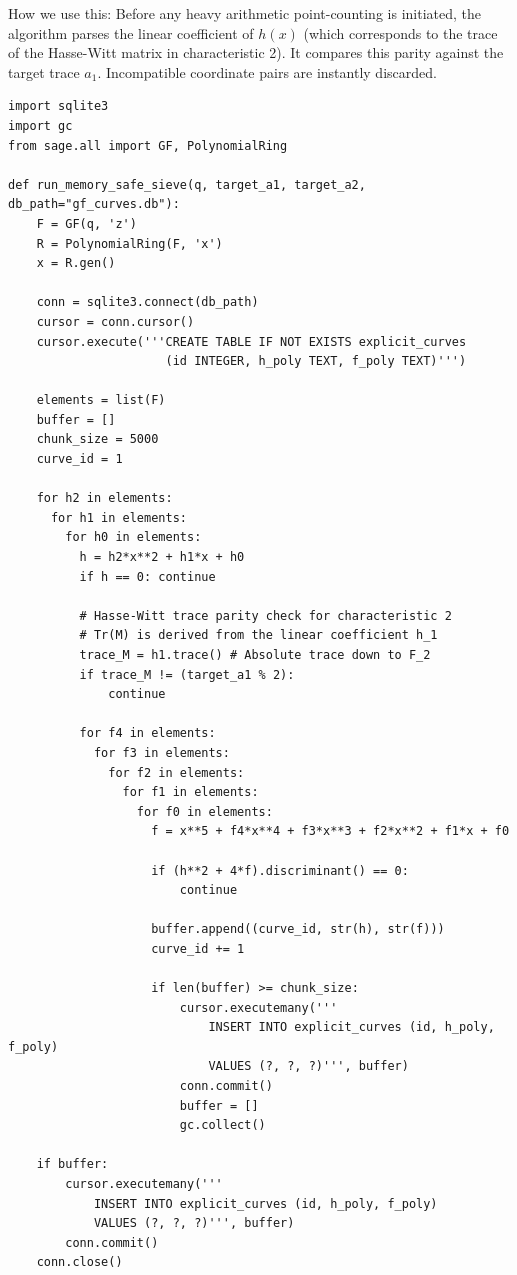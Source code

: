 \documentclass[letterpaper, 11pt]{article}
\begin{document}
How we use this: Before any heavy arithmetic point-counting is initiated, the algorithm parses the linear coefficient of $h(x)$ (which corresponds to the trace of the Hasse-Witt matrix in characteristic 2). It compares this parity against the target trace $a_1$. Incompatible coordinate pairs are instantly discarded.

\begin{lstlisting}
import sqlite3
import gc
from sage.all import GF, PolynomialRing

def run_memory_safe_sieve(q, target_a1, target_a2, db_path="gf_curves.db"):
    F = GF(q, 'z')
    R = PolynomialRing(F, 'x')
    x = R.gen()
    
    conn = sqlite3.connect(db_path)
    cursor = conn.cursor()
    cursor.execute('''CREATE TABLE IF NOT EXISTS explicit_curves
                      (id INTEGER, h_poly TEXT, f_poly TEXT)''')
    
    elements = list(F)
    buffer = []
    chunk_size = 5000
    curve_id = 1
    
    for h2 in elements:
      for h1 in elements:
        for h0 in elements:
          h = h2*x**2 + h1*x + h0
          if h == 0: continue
          
          # Hasse-Witt trace parity check for characteristic 2
          # Tr(M) is derived from the linear coefficient h_1
          trace_M = h1.trace() # Absolute trace down to F_2
          if trace_M != (target_a1 % 2):
              continue
          
          for f4 in elements:
            for f3 in elements:
              for f2 in elements:
                for f1 in elements:
                  for f0 in elements:
                    f = x**5 + f4*x**4 + f3*x**3 + f2*x**2 + f1*x + f0
                    
                    if (h**2 + 4*f).discriminant() == 0:
                        continue
                        
                    buffer.append((curve_id, str(h), str(f)))
                    curve_id += 1
                    
                    if len(buffer) >= chunk_size:
                        cursor.executemany('''
                            INSERT INTO explicit_curves (id, h_poly, f_poly)
                            VALUES (?, ?, ?)''', buffer)
                        conn.commit()
                        buffer = []
                        gc.collect() 
                        
    if buffer:
        cursor.executemany('''
            INSERT INTO explicit_curves (id, h_poly, f_poly)
            VALUES (?, ?, ?)''', buffer)
        conn.commit()
    conn.close()
\end{lstlisting}
\end{document}
